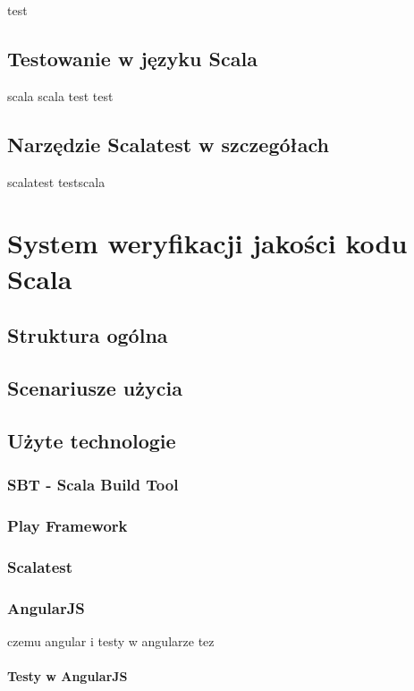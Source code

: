 \documentclass[brudnopis]{xmgr}
\begin{document}
test
    
\section{Testowanie w języku Scala}

scala scala test test 
      
\section{Narzędzie Scalatest w szczegółach}

scalatest testscala

\chapter{System weryfikacji jakości kodu Scala}

\section{Struktura ogólna}

\section{Scenariusze użycia}

\section{Użyte technologie}

\subsection{SBT - Scala Build Tool}

\subsection{Play Framework}

\subsection{Scalatest}

\subsection{AngularJS}

czemu angular i testy w angularze tez

\subsubsection{Testy w AngularJS}
\end{document}
